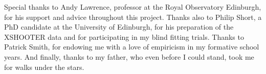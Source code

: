 \documentclass[a4paper,11pt]{article}
\begin{document}
Special thanks to Andy Lawrence, professor at the Royal Observatory Edinburgh, for his support and advice throughout this project. Thanks also to Philip Short, a PhD candidate at the University of Edinburgh, for his preparation of the XSHOOTER data and for participating in my blind fitting trials. Thanks to Patrick Smith, for endowing me with a love of empiricism in my formative school years. And finally, thanks to my father, who even before I could stand, took me for walks under the stars.

\printbibliography

%
%
%
%
\end{document}
